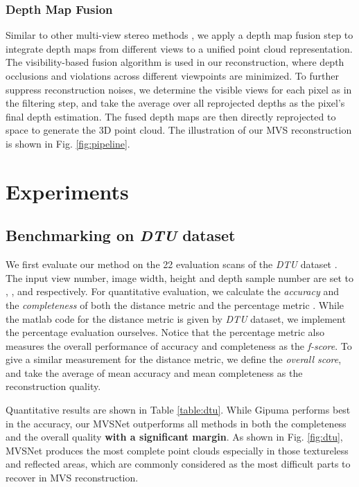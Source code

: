 \documentclass[runningheads]{llncs}
\begin{document}
\subsubsection{Depth Map Fusion} Similar to other multi-view stereo methods \cite{galliani2015massively,schonberger2016pixelwise}, we apply a depth map fusion step to integrate depth maps from different views to a unified point cloud representation. The visibility-based fusion algorithm \cite{merrell2007real} is used in our reconstruction, where depth occlusions and violations across different viewpoints are minimized. To further suppress reconstruction noises, we determine the visible views for each pixel as in the filtering step, and take the average over all reprojected depths  as the pixel's final depth estimation. The fused depth maps are then directly reprojected to space to generate the 3D point cloud. The illustration of our MVS reconstruction is shown in Fig. \ref{fig:pipeline}.



\section{Experiments}

\subsection{Benchmarking on \textit{DTU} dataset} \label{sec:dtu}

We first evaluate our method on the 22 evaluation scans of the \textit{DTU} dataset \cite{aanaes2016large}. The input view number, image width, height and depth sample number are set to , ,  and  respectively. For quantitative evaluation, we calculate the \textit{accuracy} and the \textit{completeness} of both the distance metric \cite{aanaes2016large} and the percentage metric \cite{knapitsch2017tanks}. While the matlab code for the distance metric is given by \textit{DTU} dataset, we implement the percentage evaluation ourselves. Notice that the percentage metric also measures the overall performance of accuracy and completeness as the \textit{f-score}. To give a similar measurement for the distance metric, we define the \textit{overall score}, and take the average of mean accuracy and mean completeness as the reconstruction quality. 

Quantitative results are shown in Table \ref{table:dtu}. While Gipuma \cite{tola2012efficient} performs best in the accuracy, our MVSNet outperforms all methods in both the completeness and the overall quality \textbf{with a significant margin}. As shown in Fig. \ref{fig:dtu}, MVSNet produces the most complete point clouds especially in those textureless and reflected  areas, which are commonly considered as the most difficult parts to recover in MVS reconstruction. 
\end{document}

